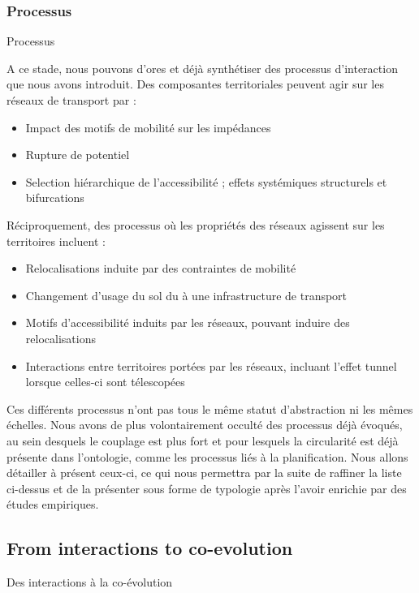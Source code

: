 
\subsubsection{Processus}{Processus}

A ce stade, nous pouvons d'ores et déjà synthétiser des processus d'interaction que nous avons introduit. Des composantes territoriales peuvent agir sur les réseaux de transport par :

\begin{itemize}
	\item Impact des motifs de mobilité sur les impédances
	\item Rupture de potentiel
	\item Selection hiérarchique de l'accessibilité ; effets systémiques structurels et bifurcations
\end{itemize}

Réciproquement, des processus où les propriétés des réseaux agissent sur les territoires incluent :
\begin{itemize}
	\item Relocalisations induite par des contraintes de mobilité
	\item Changement d'usage du sol du à une infrastructure de transport
    \item Motifs d'accessibilité induits par les réseaux, pouvant induire des relocalisations
	\item Interactions entre territoires portées par les réseaux, incluant l'effet tunnel lorsque celles-ci sont télescopées
	
	
\end{itemize}

Ces différents processus n'ont pas tous le même statut d'abstraction ni les mêmes échelles. Nous avons de plus volontairement occulté des processus déjà évoqués, au sein desquels le couplage est plus fort et pour lesquels la circularité est déjà présente dans l'ontologie, comme les processus liés à la planification. Nous allons détailler à présent ceux-ci, ce qui nous permettra par la suite de raffiner la liste ci-dessus et de la présenter sous forme de typologie après l'avoir enrichie par des études empiriques.




\subsection{From interactions to co-evolution}{Des interactions à la co-évolution}


